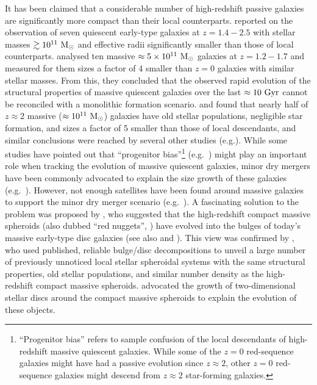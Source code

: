 It has been claimed that a considerable number of high-redshift passive galaxies are significantly more compact 
than their local counterparts. 
\citet{daddi2005} reported on the observation of seven quiescent early-type galaxies 
at $z=1.4-2.5$ with stellar masses $\gtrsim 10^{11} \rm~M_\odot$ 
and effective radii significantly smaller than those of local counterparts. 
\citet{trujillo2006} analysed ten massive $\approx 5 \times 10^{11} \rm~M_\odot$ galaxies at $z=1.2-1.7$ 
and measured for them sizes a factor of 4 smaller than $z=0$ galaxies with similar stellar masses. 
From this, they concluded that the observed rapid evolution of the structural properties of massive quiescent galaxies 
over the last $\approx 10 \rm~Gyr$ 
cannot be reconciled with a monolithic formation scenario. 
\citet{kriek2008} and \citet{vandokkum2008} found that nearly half of $z \approx 2$ 
massive ($\approx 10^{11} \rm~M_\odot$) galaxies 
have old stellar populations, negligible star formation, and sizes a factor of 5 smaller than 
those of local descendants, 
and similar conclusions were reached by several other studies 
(e.g.\citealt{toft2007,trujillo2007,zirm2007,buitrago2008,damjanov2009}). 
While some studies have pointed out that ``progenitor bias''\footnote{``Progenitor bias'' refers to sample confusion 
of the local descendants of high-redshift massive quiescent galaxies. 
While some of the $z=0$ red-sequence galaxies might have had a passive evolution since $z \approx 2$, 
other $z=0$ red-sequence galaxies might descend from $z \approx 2$ star-forming galaxies. } 
(e.g.~\citealt{carollo2014}) might play an important role 
when tracking the evolution of massive quiescent galaxies, 
minor dry mergers have been commonly advocated to explain the size growth of these galaxies 
(e.g.~\citealt{hopkins2009,carrasco2010,cimatti2012,fan2013,de2014}).
However, not enough satellites have been found around massive galaxies 
to support the minor dry merger scenario 
(e.g.~\citealt{khochfarburkert2006,maller2006,hopkins2009,naab2009,mclure2013}). 
A fascinating solution to the problem was proposed by \citet{graham2013review}, 
who suggested that the high-redshift compact massive spheroids 
(also dubbed ``red nuggets'', \citealt{damjanov2009}) have evolved into the bulges 
of today's massive early-type disc galaxies (see also \citealt{dullograham2014cores} and \citealt{driver2013}). 
This view was confirmed by \citet{gds2015}, 
who used published, reliable bulge/disc decompositions 
to unveil a large number of previously unnoticed local stellar spheroidal systems 
with the same structural properties, old stellar populations, 
and similar number density as the high-redshift compact massive spheroids. 
\citet{gds2015} advocated the growth of two-dimensional stellar discs around the compact massive spheroids 
to explain the evolution of these objects. \\

